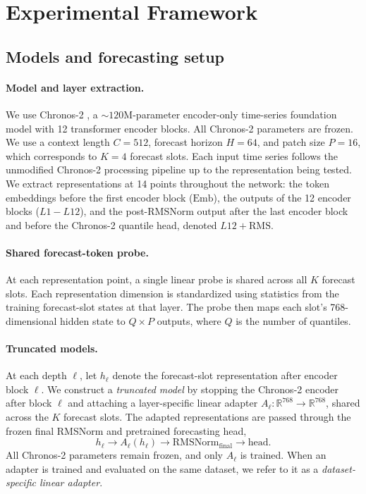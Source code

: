 \documentclass{article}
\begin{document}
\section{Experimental Framework}

\subsection{Models and forecasting setup} \label{sec:model-setup}

\paragraph{Model and layer extraction.} We use Chronos-2 \citep{ansari2025chronos2univariateuniversalforecasting}, a ${\sim}120$M-parameter encoder-only time-series foundation model with 12 transformer encoder blocks. All Chronos-2 parameters are frozen. We use a context length \(C=512\), forecast horizon \(H=64\), and patch size \(P=16\), which corresponds to \(K=4\) forecast slots. Each input time series follows the unmodified Chronos-2 processing pipeline up to the representation being tested. We extract representations at 14 points throughout the network: the token embeddings before the first encoder block (\(\mathrm{Emb}\)), the outputs of the 12 encoder blocks (\(L1 - L12\)), and the post-RMSNorm output after the last encoder block and before the Chronos-2 quantile head, denoted \(L12 + \mathrm{RMS}\).

\paragraph{Shared forecast-token probe.} At each representation point, a single linear probe is shared across all \(K\) forecast slots. Each representation dimension is standardized using statistics from the training forecast-slot states at that layer. The probe then maps each slot's 768-dimensional hidden state to \(Q\times P\) outputs, where \(Q\) is the number of quantiles. 

\paragraph{Truncated models.}
At each depth \(\ell\), let \(h_\ell\) denote the forecast-slot representation after encoder block \(\ell\). We construct a \textit{truncated model} by stopping the Chronos-2 encoder after block \(\ell\) and attaching a layer-specific linear adapter
\(A_\ell:\mathbb{R}^{768}\rightarrow\mathbb{R}^{768}\), shared across the \(K\) forecast slots.
The adapted representations are passed through the frozen final RMSNorm and pretrained forecasting head,
\[
h_\ell \rightarrow A_\ell(h_\ell)
\rightarrow \mathrm{RMSNorm}_{\mathrm{final}}
\rightarrow \mathrm{head}.
\]
All Chronos-2 parameters remain frozen, and only \(A_\ell\) is trained. When an adapter is trained and evaluated on the same dataset, we refer to it as a \textit{dataset-specific linear adapter}.
\end{document}
